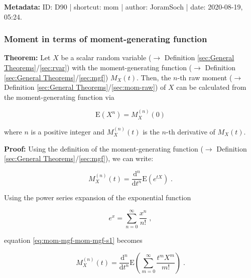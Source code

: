 \documentclass[a4paper,12pt,twoside]{book}
\begin{document}
\vspace{1em}
\textbf{Metadata:} ID: D90 | shortcut: mom | author: JoramSoch | date: 2020-08-19, 05:24.
\vspace{1em}



\subsubsection[\textbf{Moment in terms of moment-generating function}]{Moment in terms of moment-generating function} \label{sec:mom-mgf}
\setcounter{equation}{0}

\textbf{Theorem:} Let $X$ be a scalar random variable ($\rightarrow$ Definition \ref{sec:General Theorems}/\ref{sec:rvar}) with the moment-generating function ($\rightarrow$ Definition \ref{sec:General Theorems}/\ref{sec:mgf}) $M_X(t)$. Then, the $n$-th raw moment ($\rightarrow$ Definition \ref{sec:General Theorems}/\ref{sec:mom-raw}) of $X$ can be calculated from the moment-generating function via

\begin{equation} \label{eq:mom-mgf-mom-mgf}
\mathrm{E}(X^n) = M_X^{(n)}(0)
\end{equation}

where $n$ is a positive integer and $M_X^{(n)}(t)$ is the $n$-th derivative of $M_X(t)$.


\vspace{1em}
\textbf{Proof:} Using the definition of the moment-generating function ($\rightarrow$ Definition \ref{sec:General Theorems}/\ref{sec:mgf}), we can write:

\begin{equation} \label{eq:mom-mgf-mom-mgf-s1}
M_X^{(n)}(t) = \frac{\mathrm{d}^n}{\mathrm{d}t^n} \mathrm{E}(e^{tX}) \; .
\end{equation}

Using the power series expansion of the exponential function

\begin{equation} \label{eq:mom-mgf-exp-ps}
e^x = \sum_{n=0}^\infty \frac{x^n}{n!} \; ,
\end{equation}

equation \eqref{eq:mom-mgf-mom-mgf-s1} becomes

\begin{equation} \label{eq:mom-mgf-mom-mgf-s2}
M_X^{(n)}(t) = \frac{\mathrm{d}^n}{\mathrm{d}t^n} \mathrm{E}\left( \sum_{m=0}^\infty \frac{t^m X^m}{m!} \right) \; .
\end{equation}
\end{document}
